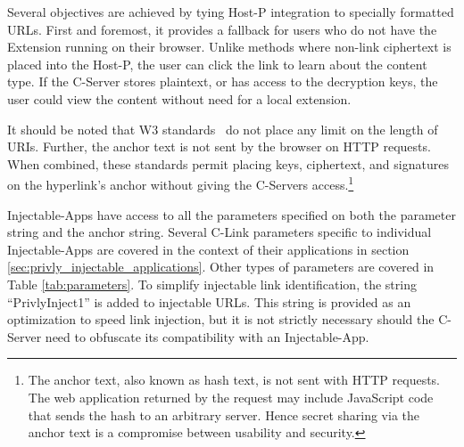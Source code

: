 \documentclass[letterpaper,twocolumn,10pt]{article}
\begin{document}
Several objectives are achieved by tying Host-P integration to specially formatted
URLs. First and foremost, it provides a 
fallback for users who do not have the Extension running on their browser. Unlike 
methods where non-link ciphertext is placed into the Host-P, the user can click 
the link to learn about the content type. If the C-Server stores plaintext, or has 
access to the decryption keys, the user could view the content without need for a 
local extension.

It should be noted that W3 
standards~\cite{Fielding1999} do not place any limit on the length of URIs. 
Further, the anchor text is not sent by the browser on HTTP requests. When 
combined, these standards permit placing keys, ciphertext, and signatures on the 
hyperlink's anchor without giving the C-Servers access.\footnote{The anchor text, 
also known as hash text, is not sent with HTTP requests. The web application 
returned by the request may include JavaScript code that sends the hash to an 
arbitrary server. Hence secret sharing via the anchor text is a compromise between 
usability and security.}

Injectable-Apps have access to all the parameters specified on both the parameter 
string and the anchor string. Several C-Link parameters specific to individual 
Injectable-Apps are covered in 
the context of their applications in section \ref{sec:privly_injectable_applications}.
Other types of parameters are covered in  Table \ref{tab:parameters}.
To simplify injectable link identification, the string ``PrivlyInject1'' is added 
to injectable URLs. This string is provided as an optimization to speed link 
injection, but it is not strictly necessary should the C-Server need to obfuscate 
its compatibility with an Injectable-App.
\end{document}
